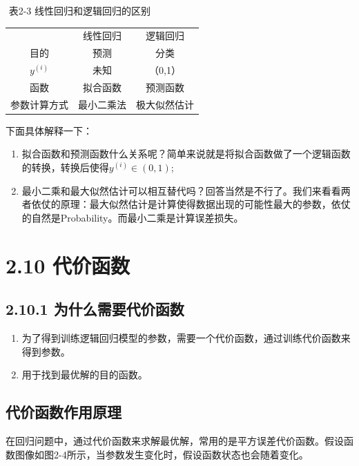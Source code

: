​ 表2-3 线性回归和逻辑回归的区别

\begin{longtable}[]{ ccc }
& 线性回归 & 逻辑回归\tabularnewline
目的 & 预测 & 分类\tabularnewline
$y^{(i)}$ & 未知 & （0,1）\tabularnewline
函数 & 拟合函数 & 预测函数\tabularnewline
参数计算方式 & 最小二乘法 & 极大似然估计\tabularnewline
\end{longtable}

下面具体解释一下：

\begin{enumerate}
\def\labelenumi{\arabic{enumi}.}
\item
  拟合函数和预测函数什么关系呢？简单来说就是将拟合函数做了一个逻辑函数的转换，转换后使得$y^{(i)} \in (0,1)$;
\item
  最小二乘和最大似然估计可以相互替代吗？回答当然是不行了。我们来看看两者依仗的原理：最大似然估计是计算使得数据出现的可能性最大的参数，依仗的自然是Probability。而最小二乘是计算误差损失。
\end{enumerate}

\section{2.10 代价函数}\label{ux4ee3ux4ef7ux51fdux6570}

\subsection{2.10.1
为什么需要代价函数}\label{ux4e3aux4ec0ux4e48ux9700ux8981ux4ee3ux4ef7ux51fdux6570}

\begin{enumerate}
\def\labelenumi{\arabic{enumi}.}
\item
  为了得到训练逻辑回归模型的参数，需要一个代价函数，通过训练代价函数来得到参数。
\item
  用于找到最优解的目的函数。
\end{enumerate}

\subsection{代价函数作用原理}\label{ux4ee3ux4ef7ux51fdux6570ux4f5cux7528ux539fux7406}

​
在回归问题中，通过代价函数来求解最优解，常用的是平方误差代价函数。假设函数图像如图2-4所示，当参数发生变化时，假设函数状态也会随着变化。

